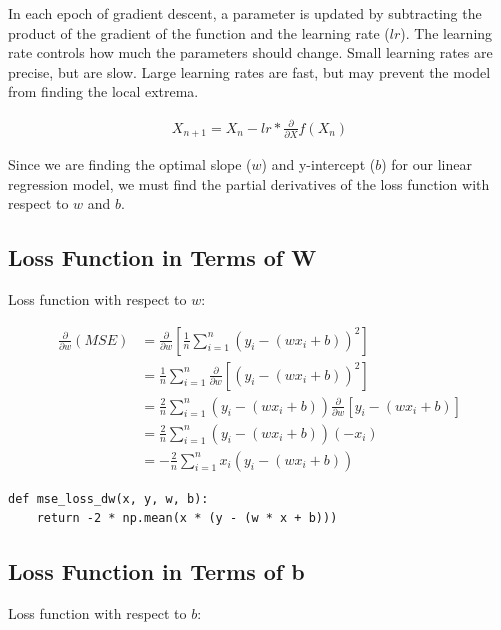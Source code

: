 \documentclass[openany]{book}
\begin{document}
    In each epoch of gradient descent, a parameter is updated by subtracting
the product of the gradient of the function and the learning rate
(\(lr\)). The learning rate controls how much the parameters should
change. Small learning rates are precise, but are slow. Large learning
rates are fast, but may prevent the model from finding the local
extrema.

\begin{align*}
X_{n+1} = X_n - lr * \frac{\partial}{\partial X} f(X_n)
\end{align*}

Since we are finding the optimal slope (\(w\)) and y-intercept (\(b\))
for our linear regression model, we must find the partial derivatives of
the loss function with respect to \(w\) and \(b\).

    \subsection{Loss Function in Terms of
W}\label{loss-function-in-terms-of-w}

    Loss function with respect to \(w\):

\begin{align*}
\frac{\partial }{\partial w} \left( MSE \right) &= \frac{\partial }{\partial w}[\frac{1}{n} \sum_{i=1}^{n}(y_{i}-(w x_{i} + b))^2] \\
&= \frac{1}{n} \sum_{i=1}^{n} \frac{\partial }{\partial w}[(y_{i}-(w x_{i} + b))^2] \\
&= \frac{2}{n} \sum_{i=1}^{n} (y_{i}-(w x_{i} + b))\frac{\partial }{\partial w}[y_{i}-(w x_{i} + b)] \\
&= \frac{2}{n} \sum_{i=1}^{n} (y_{i}-(w x_{i} + b))(-x_{i}) \\ 
&= -\frac{2}{n} \sum_{i=1}^{n}x_{i}(y_{i}-(w x_{i} + b))
\end{align*}

\begin{tcolorbox}
\tiny
\begin{verbatim}
def mse_loss_dw(x, y, w, b):
    return -2 * np.mean(x * (y - (w * x + b)))
\end{verbatim}
\end{tcolorbox}

    \subsection{Loss Function in Terms of
b}\label{loss-function-in-terms-of-b}

    Loss function with respect to \(b\):
\end{document}
